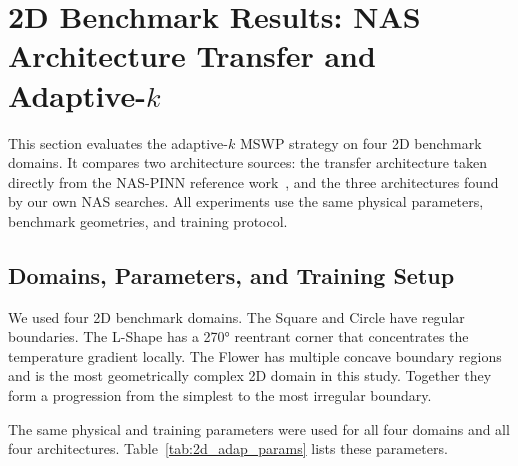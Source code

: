 \section{2D Benchmark Results: NAS Architecture Transfer and Adaptive-$k$}
\label{sec:results_2d_adaptive}

This section evaluates the adaptive-$k$ MSWP strategy on four 2D benchmark
domains.
It compares two architecture sources: the transfer architecture taken directly
from the NAS-PINN reference work~\cite{wang2023}, and the three architectures
found by our own NAS searches.
All experiments use the same physical parameters, benchmark geometries, and
training protocol.

\subsection{Domains, Parameters, and Training Setup}
\label{subsec:2d_adap_setup}

We used four 2D benchmark domains.
The Square and Circle have regular boundaries.
The L-Shape has a 270° reentrant corner that concentrates the temperature
gradient locally.
The Flower has multiple concave boundary regions and is the most geometrically
complex 2D domain in this study.
Together they form a progression from the simplest to the most irregular
boundary.

The same physical and training parameters were used for all four domains and
all four architectures.
Table~\ref{tab:2d_adap_params} lists these parameters.

